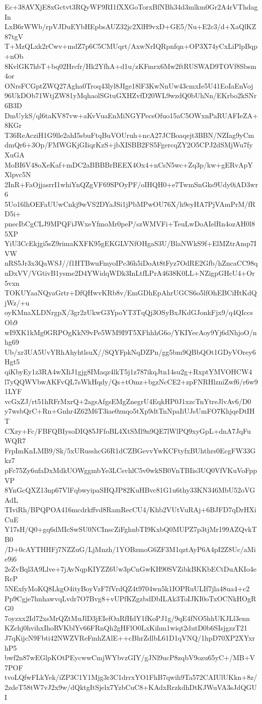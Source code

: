 Ec+38AVXjE8xGctvt3RQyWF9RI1fXXGoTorxBfNBh34d3mlkm0Gr2A4rVThdagIn
LxB6rWWb/rpVJDuEYbHEpbsAUZ32jc2XlH9vxD+GE5/Nu+E2c3/d+XaQlKZ87tgV
T+MzQLxk2rCwv+mdZ7p6C5CMUqrt/AxwNrIQRpnfqn+OP3X74yCxLiPlpBqp+nOb
8KvlGK7hbT+bq02Hrcfr/Hk2YfhA+d1u/zKFmrx6Mw2ftRUSWAD9TOVf8Sbsm4or
ONrsFCGptZWQ27Agha0Troq43lyl8JIge18lF3KwNnUw43cmxIe5U41EoIaEnVoj
96UkDOb71WtjZW81yMqhaolSGtuGXHZvfD20WL9wzdQ0bUhNn/EKrbo2kSNr6B3D
DmUykS/ql6taKV87vw+aKvVuaEnMiNGYPecsOfuo15aC5OWxnPaRUAFIeZA+8KGr
T36ReAcziH1G9lle2ahI5sbuFtqBuVOUruh+ncA27JCBoaqejt3BBN/NZIag9yCm
dmQr6+3Op/FMWGKjGIiqrKzS+jbXISBB2FS5FgercqZY2O5CPJ2dSMjWu7fyXuGA
MoBI6V48oXeKaf+mDC2aBBBBrBEEX4Ox4+nCsN5wc+Zq3p/kw+gERvApYXlpvc5N
2InR+FaOjjasrrI1whiYnQZgVF69SPOyPF/oIHQH0+e7TwmSnGks9Udy0iAD3wr6
5Uo16lhOEFaUUwCnkj9wVS2DYaJSi1jPbMPwOU76X/h9eyHA7PjVAmPrM/fRD5i+
pnecIbCgCLJ9MPQFiJWxeYfmoMr0peP/szWMVFi+TeuLwDoAIelRn4ozAH0l85XP
YiU3CcEkjgi5sZ9rimaKXFK95gEKGLVNfOHgaS3U/BlaNWkS9f+ElMZtrAmp7IVW
nRS5Jr3x3QaWSJ//f1HTBwuFmyoIPc36h5iDoAt8tFyz7OdRE2Gfb/hZncaCC98q
nDxVV/VGtivB1ysme2D4YWidqWDk3InLtfLPrA4638K0LL+NZigpGHcU4+Or5vxn
TOKUYaaNQyaGrtr+DfQHwvKRb8v/EmGDhEpAhrUGCS6o5lfOhEBCiHtKdQjWz/+u
oyKMnaXLDNrgpX/3gr2zUkwG3YpoYT3TqQj3OSyBxJKdGJonkFjx9/q4QIccsOb9
wI9XK1kMg0GRPOgKkN9vPe5WM9I9T5XFhhhG6o/YKIYecAoy9Yj6dNhjoO/nhg69
Ub/xr3UA5UvYRhAhyhtlsuX//SQYFpkNqDZPn/gg5bm9QBbQOt1GDyVOrey6Hgt5
qiKbyEy1z3RA4wXIiJ1gjg8IMaqz4lkT5j1z787ikqJtn14su2g+RxptYMVOHCW4
l7yQQWVbwAKFvQL7sWkHqdy/Qs+tOmz+bgzNcCE2+zpFNRHlzniZwf6/r6w91LYF
vcGxZJ/rt51hRFrMxrQ+2agsAfgsEMgZnegrU4EqkHP0J1xzcTnYtreJlvAv6/D0
y7wsbQrC+Rn+Gnhr4Z62M6T3iae0znqo5tXp9dtTnNpaIiUJsUmFO7KhjqeDtIHT
CXzy+Fc/FBFQBIysoDIQ85JFfoBL4XtSMl9n9QE7lWlPQ9xyGpL+dnA7JqFuWQR7
FrpImKnLMB9/Sk/5xURusshcG6R1dCZBGevvYwKCFtyfxBUhthrs0EcgFW33Gkz7
pFc75Zy6ufaDxMdkUOWggmbYe3LCsvhlC5v0wkSB0VnTBIis3UQ0VfVKuVoFppVP
8YnGcQXZ13np67VlFqbwyipaSHQJP82KuHBvc81G1u6thy33KN346MbU52oVGAdL
TIviRh/BPQPOA416mcdrkffvd8RamRecCU4/Khb2VUtVuRAj+6BJFD7qDrHXiCuE
Y17sH/Q0+gq6dMIcSwSU0NCInscZiFghnbTI9KxbQ0MUPZ7p3tjMr199AZQvkTB0
/D+0cAYTHHFj7NZZuG/LjMnzh/1YOBzmoG6ZF3M1qztAyP6A4pI2Z8Uc/aMie9i6
2eZvBql3A9Llve+7jAvNqpKIYZZ6Uw3pCnGwKH90SVZibkBKKbECtDuAKIo4eRcP
5NExfyMoKQ8LkgO4ityBoyVzF7fVrdQZ4t9704wn5k1IOPRuULIf7jla48ua4+c2
Pp9Cgje7hnhawvqLvdr7O7Bvg8+vUPfKZgzbdDbILAk3ToIJKI0oTxOCNkHOgRG0
7oyzxx2Id72xsMrQZtMuJlD3jEIefOaRfHdY1fKoPJ1g/9qE4fNO5hhUKJLl3enn
KZchj0hvihxIhoRVKblYv66FRnQh2gHFlO0LxKihm1wiqt2dutD0b6SIsjgzzT21
J7qKijcN9Fbti42NWZVReFmhZAlE++cBhrZdlbL61D1qVNQ/1hpD70XP2XYxrhP5
bwf2n87wEGlpKOtPEycwwCmjWYbvzGIY/gJNl9ucP8zqbV9ozu65yC+/MB+V7POF
tvoLQfwFLkYek/iZP3C1Y1Mjg3r3C1drrxYO1FhB7qwih9Ta572CAIUlUKkn+8z/
2zdeT58tW7vJ2x9w/dQktgItSjelx7YzbCuC8+KAdxRrzkdhDtKJWuVA3sJdQGUI
